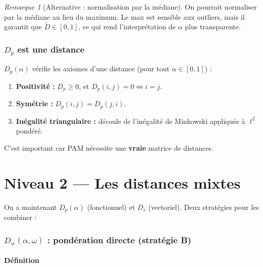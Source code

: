 \documentclass[11pt, a4paper]{article}
\newcommand{\Dp}{D_p}
\newcommand{\Dw}{D_w}
\theoremstyle{definition}
\theoremstyle{remark}
\newtheorem{remarque}{Remarque}[section]
\begin{document}
\begin{remarque}[Alternative : normalisation par la médiane]
On pourrait normaliser par la médiane au lieu du maximum. Le max est sensible
aux outliers, mais il garantit que $\tilde{D} \in [0, 1]$, ce qui rend
l'interprétation de $\alpha$ plus transparente.
\end{remarque}

\section{$\Dp$ est une distance}

$\Dp(\alpha)$ vérifie les axiomes d'une distance (pour tout $\alpha \in [0,1]$) :
\begin{enumerate}[nosep]
  \item \textbf{Positivité :} $\Dp \geq 0$, et $\Dp(i,j) = 0 \iff i = j$.
  \item \textbf{Symétrie :} $\Dp(i,j) = \Dp(j,i)$.
  \item \textbf{Inégalité triangulaire :} découle de l'inégalité de Minkowski
    appliquée à $\ell^2$ pondéré.
\end{enumerate}
C'est important car PAM nécessite une \textbf{vraie} matrice de distances.

\newpage
\part{Niveau 2 — Les distances mixtes}

On a maintenant $\Dp(\alpha)$ (fonctionnel) et $D_s$ (vectoriel). Deux
stratégies pour les combiner :

\section{$\Dw(\alpha, \omega)$ : pondération directe (stratégie B)}

\subsection{Définition}
\end{document}
